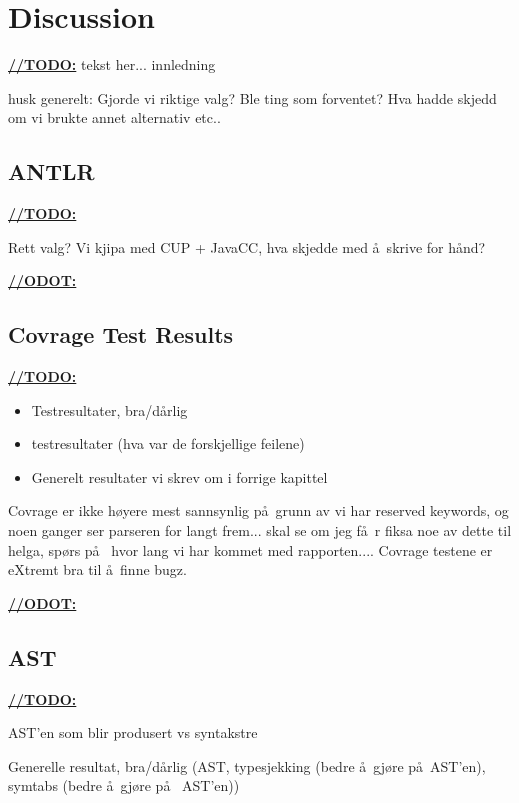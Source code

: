 \chapter{Discussion}
\underline{\textbf{\LARGE //TODO:}} tekst her... innledning


husk generelt: Gjorde vi riktige valg? Ble ting som forventet? Hva hadde skjedd om vi brukte annet alternativ etc..







\section{ANTLR}
\underline{\textbf{\LARGE //TODO:}}

Rett valg?
Vi kjipa med CUP + JavaCC, hva skjedde med \aa~skrive for h\aa nd?

\underline{\textbf{\LARGE //ODOT:}}




\section{Covrage Test Results}

\underline{\textbf{\LARGE //TODO:}}
\begin{itemize}
\item Testresultater, bra/d\aa rlig
\item testresultater (hva var de forskjellige feilene)
\item Generelt resultater vi skrev om i forrige kapittel
\end{itemize}

Covrage er ikke h\o yere mest sannsynlig p\aa~grunn av vi har reserved keywords, og noen ganger ser parseren for langt frem... skal se om jeg f\aa~r fiksa noe av dette til helga, sp\o rs p\aa~ hvor lang vi har kommet med rapporten.... Covrage testene er eXtremt bra til \aa~finne bugz.

\underline{\textbf{\LARGE //ODOT:}}

\section{AST}
\underline{\textbf{\LARGE //TODO:}}

AST'en som blir produsert vs syntakstre

Generelle resultat, bra/d\aa rlig (AST, typesjekking (bedre \aa~gj\o re p\aa~AST'en),
symtabs (bedre \aa~gj\o re p\aa~ AST'en))

